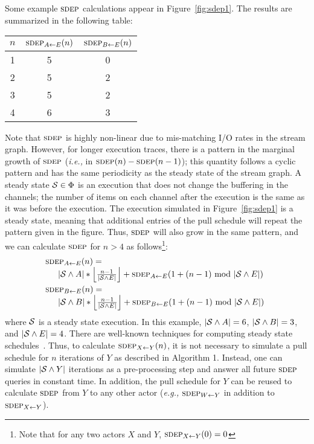 Some example $\textsc{sdep}$ calculations appear in Figure~\ref{fig:sdep1}.
The results are summarized in the following table:
\begin{center}
\begin{tabular}{|c|c|c|}
\hline
$n$ & $\sdepf{A}{E}(n)$ & $\sdepf{B}{E}(n)$ \\
\hline \hline
1 & 5 & 0 \\ \hline
2 & 5 & 2 \\ \hline
3 & 5 & 2 \\ \hline
4 & 6 & 3 \\ \hline
\end{tabular}
\end{center}
Note that $\textsc{sdep}$ is highly non-linear due to mis-matching I/O rates
in the stream graph.  However, for longer execution traces, there is a
pattern in the marginal growth of $\textsc{sdep}$ ({\it i.e.,} in $\textsc{sdep}(n) -
\textsc{sdep}(n-1)$); this quantity follows a cyclic pattern and has the same
periodicity as the steady state of the stream graph.  A steady state
${\cal S} \in \Phi$ is an execution that does not change the buffering
in the channels; the number of items on each channel after the
execution is the same as it was before the execution.  The execution
simulated in Figure~\ref{fig:sdep1} is a steady state, meaning that
additional entries of the pull schedule will repeat the pattern given
in the figure.  Thus, $\textsc{sdep}$ will also grow in the same pattern, and
we can calculate $\textsc{sdep}$ for $n > 4$ as follows\footnote{Note that for
any two actors $X$ and $Y$, $\sdepf{X}{Y}(0) = 0$}:
\begin{equation*}
\begin{array}{l}
\mbox{} \hspace{-5pt} \sdepf{A}{E}(n) = \\ 
~~~|{\cal S} \wedge A| * \floor{n-1}{|{\cal S} \wedge E|} + \sdepf{A}{E}(1 + (n-1)~\mbox{mod}~|{\cal S} \wedge E|) \vspace{3pt} \\
\mbox{} \hspace{-5pt} \sdepf{B}{E}(n) = \\
~~~|{\cal S} \wedge B| * \floor{n-1}{|{\cal S} \wedge E|} + \sdepf{B}{E}(1 + (n-1)~\mbox{mod}~|{\cal S} \wedge E|)
\end{array}
\end{equation*}
where ${\cal S}$ is a steady state execution.  In this example,
$|{\cal S} \wedge A| = 6$, $|{\cal S} \wedge B| = 3$, and $|{\cal S}
\wedge E| = 4$.  There are well-known techniques for computing steady
state schedules~\cite{LM87-i}.  Thus, to calculate $\sdepf{X}{Y}(n)$,
it is not necessary to simulate a pull schedule for $n$ iterations of
$Y$ as described in Algorithm 1.  Instead, one can simulate $|{\cal S}
\wedge Y|$ iterations as a pre-processing step and answer all future
$\textsc{sdep}$ queries in constant time.  In addition, the pull schedule for
$Y$ can be reused to calculate $\textsc{sdep}$ from $Y$ to any other actor
({\it e.g.,} $\sdepf{W}{Y}$ in addition to $\sdepf{X}{Y}$).

